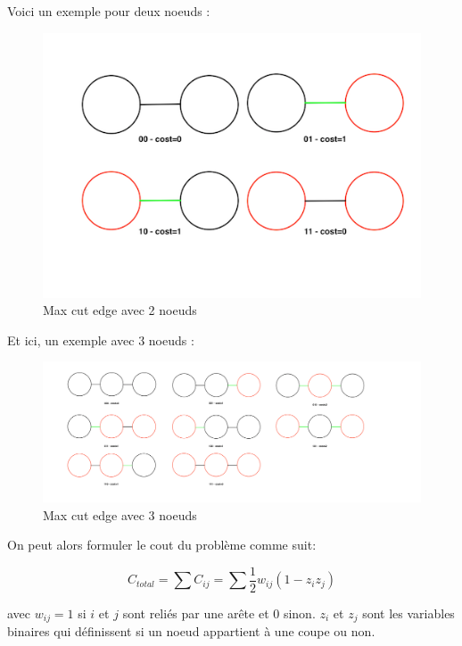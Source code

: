 \documentclass{article}
\begin{document}
\begin{multicols}{2}
Voici un exemple pour deux noeuds : 


\begin{figure}[H]
    \centering
    \includegraphics[width = \columnwidth]{fig/02_2_nodes_cuts.png}
    \caption{Max cut edge avec 2 noeuds}
    \label{fig:Max_cut_edge_2}
\end{figure}

Et ici, un exemple avec 3 noeuds :
\begin{figure}[H]
    \centering
    \includegraphics[width = \columnwidth]{fig/02_3_nodes_cuts.png}
    \caption{Max cut edge avec 3 noeuds}
    \label{fig:Max_cut_edge_3}
\end{figure}

On peut alors formuler le cout du problème comme suit:

\begin{equation}
    C_{total} = \sum C_{ij} = \sum \frac{1}{2} w_{ij} (1 - z_i z_j)
\end{equation}

avec $w_{ij} = 1$ si $i$ et $j$ sont reliés par une arête et $0$ sinon. $z_i$ et $z_j$ sont les variables binaires qui définissent si un noeud appartient à une coupe ou non.



\end{multicols}
\end{document}

